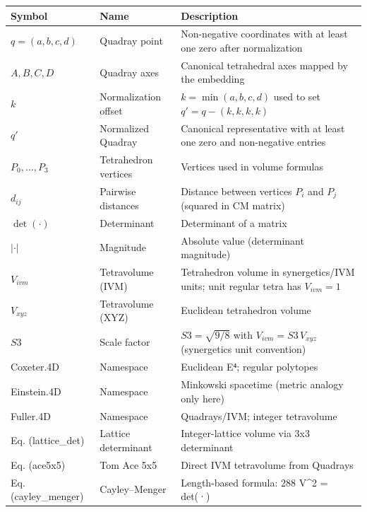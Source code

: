 \documentclass[
  10pt,
]{article}
\newcounter{none} %
\begin{document}
{\def\LTcaptype{none} %
\begin{longtable}[]{@{}
  >{\raggedright\arraybackslash}p{}
  >{\raggedright\arraybackslash}p{}
  >{\raggedright\arraybackslash}p{}@{}}
\toprule\noalign{}
\begin{minipage}[b]{\linewidth}\raggedright
Symbol
\end{minipage} & \begin{minipage}[b]{\linewidth}\raggedright
Name
\end{minipage} & \begin{minipage}[b]{\linewidth}\raggedright
Description
\end{minipage} \\
\midrule\noalign{}
\endhead
\bottomrule\noalign{}
\endlastfoot
\(q=(a,b,c,d)\) & Quadray point & Non-negative coordinates with at least
one zero after normalization \\
\(A,B,C,D\) & Quadray axes & Canonical tetrahedral axes mapped by the
embedding \\
\(k\) & Normalization offset & \(k=\min(a,b,c,d)\) used to set
\(q' = q - (k,k,k,k)\) \\
\(q'\) & Normalized Quadray & Canonical representative with at least one
zero and non-negative entries \\
\(P_0,\ldots,P_3\) & Tetrahedron vertices & Vertices used in volume
formulas \\
\(d_{ij}\) & Pairwise distances & Distance between vertices \(P_i\) and
\(P_j\) (squared in CM matrix) \\
\(\det(\cdot)\) & Determinant & Determinant of a matrix \\
\(\lvert\cdot\rvert\) & Magnitude & Absolute value (determinant
magnitude) \\
\(V_{ivm}\) & Tetravolume (IVM) & Tetrahedron volume in synergetics/IVM
units; unit regular tetra has \(V_{ivm}=1\) \\
\(V_{xyz}\) & Tetravolume (XYZ) & Euclidean tetrahedron volume \\
\(S3\) & Scale factor & \(S3=\sqrt{9/8}\) with \(V_{ivm} = S3\,V_{xyz}\)
(synergetics unit convention) \\
Coxeter.4D & Namespace & Euclidean E⁴; regular polytopes \\
Einstein.4D & Namespace & Minkowski spacetime (metric analogy only
here) \\
Fuller.4D & Namespace & Quadrays/IVM; integer tetravolume \\
Eq. (lattice\_det) & Lattice determinant & Integer-lattice volume via
3x3 determinant \\
Eq. (ace5x5) & Tom Ace 5x5 & Direct IVM tetravolume from Quadrays \\
Eq. (cayley\_menger) & Cayley--Menger & Length-based formula: 288 V\^{}2
= det(·) \\
\end{longtable}
}
\end{document}
